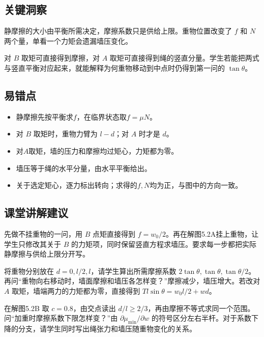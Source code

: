 \documentclass[UTF8,fontset=fandol,a4paper,11pt]{ctexart}
\begin{document}


\subsection*{关键洞察}

静摩擦的大小由平衡所需决定，摩擦系数只是供给上限。重物位置改变了 $f$ 和 $N$ 两个量，单看一个力矩会遗漏墙压变化。

对 $B$ 取矩可直接得到摩擦，对 $A$ 取矩可直接得到绳的竖直分量。学生若能把两式与竖直平衡对应起来，就能解释为何重物移动到中点时仍得到第一问的 $\tan\theta$。



\subsection*{易错点}

\begin{itemize}\item 静摩擦先按平衡求$f$，在临界状态取$f=\mu N$。\item 对 $B$ 取矩时，重物力臂为 $l-d$；对 $A$ 时才是 $d$。\item 对$A$取矩，墙的压力和摩擦均过矩心，力矩都为零。\item 墙压等于绳的水平分量，由水平平衡给出。\item 关于选定矩心，逐力标出转向；求得的$f,N$均为正，与图中的方向一致。\end{itemize}



\subsection*{课堂讲解建议}

先做不挂重物的一问，用 $B$ 点矩直接得到 $f=w_0/2$。再在解图5.2A挂上重物，让学生只修改其关于 $B$ 的力矩项，同时保留竖直方程求墙压。要求每一步都把实际静摩擦与供给上限分开写。

将重物分别放在 $d=0,l/2,l$，请学生算出所需摩擦系数 $2\tan\theta,\tan\theta,\tan\theta/2$。再问“重物向右移动时，墙面摩擦和墙压各怎样变？”摩擦减少，墙压增大。若改对 $A$ 取矩，墙端两力的力矩都为零，直接得到 $Tl\sin\theta=w_0l/2+wd$。

在解图5.2B 取 $c=0.8$，由交点读出 $d/l\geq2/3$，再由摩擦不等式求同一个范围。问“加重时摩擦系数下限怎样变？”由 $\partial\mu_{\min}/\partial w$ 的符号区分左右半杆。对于系数下降的分支，请学生同时写出绳张力和墙压随重物变化的关系。
\end{document}
